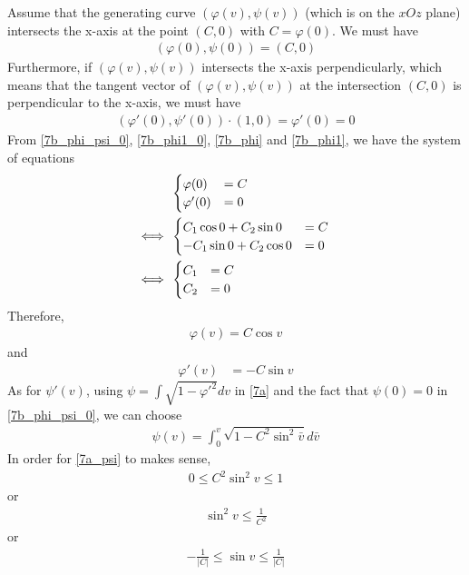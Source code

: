 \documentclass[a4paper]{report}
\begin{document}
Assume that the generating curve $(\varphi(v), \psi(v))$ (which is on the $xOz$ plane) intersects the x-axis at the point $(C,0)$ with $C = \varphi(0)$. We must have
\begin{align}
	(\varphi(0), \psi(0)) = (C,0) \label{7b_phi_psi_0}
\end{align}
Furthermore, if $(\varphi(v), \psi(v))$ intersects the x-axis perpendicularly, which means that the tangent vector of $(\varphi(v), \psi(v))$ at the intersection $(C,0)$ is perpendicular to the x-axis, we must have
\begin{align}
	(\varphi'(0), \psi'(0)) \cdot (1,0) = \varphi'(0) = 0 \label{7b_phi1_0}
\end{align}
From \eqref{7b_phi_psi_0}, \eqref{7b_phi1_0}, \eqref{7b_phi} and \eqref{7b_phi1}, we have the system of equations
\begin{align}
	&\begin{cases}
	\varphi(0) &= C\\
	\varphi'(0) &= 0
	\end{cases}\\
	\Longleftrightarrow\enskip&
	\begin{cases}
	 C_1 \cos 0 + C_2 \sin 0 &= C\\
	- C_1 \sin 0 + C_2 \cos 0 &= 0
	\end{cases}\\
	\Longleftrightarrow\enskip&
	\begin{cases}
	C_1 &= C\\
	C_2 &= 0
	\end{cases}
\end{align}
Therefore,
\begin{align}
	\varphi(v) = C \cos v\label{7b_phi_2}
\end{align}
and
\begin{align}
\varphi'(v) &= - C \sin v \label{7b_phi1_2}
\end{align}
As for $\psi'(v)$, using $\psi = \int \sqrt{1 - {\varphi'}^2} dv$ in \ref{7a} and the fact that $\psi(0) = 0$ in \eqref{7b_phi_psi_0}, we can choose
\begin{align}
	\psi(v) = \int_{0}^{v} \sqrt{1 - C^2\sin^2 \bar{v}}d\bar{v} \label{7a_psi}
\end{align}
In order for \eqref{7a_psi} to makes sense,
\begin{align}
	0 \leq C^2\sin^2 v \leq 1
\end{align}
or
\begin{align}
	\sin^2 v \leq \frac{1}{C^2} 
\end{align}
or
\begin{align}
	- \frac{1}{\lvert C\rvert}  \leq \sin v \leq \frac{1}{\lvert C\rvert} 
\end{align}
\end{document}
